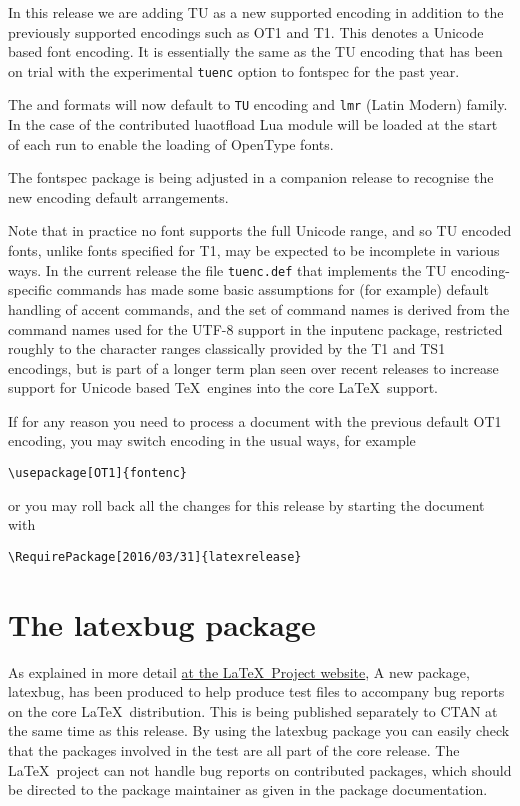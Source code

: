 \documentclass{ltnews}
\begin{document}
In this release we are adding TU as a new supported
encoding in addition to the previously supported encodings such as OT1
and T1. This denotes a Unicode based font encoding. It is essentially
the same as the TU encoding that has been on trial with the
experimental \texttt{tuenc} option to \textsf{fontspec} for the past
year.

The  and  formats will now default
to \texttt{TU} encoding and \texttt{lmr} (Latin Modern) family. In the
case of  the contributed \textsf{luaotfload} Lua
module will be loaded at the start of each run to enable the loading
of OpenType fonts.

The \textsf{fontspec} package is being adjusted in a companion release
to recognise the new encoding default arrangements.

Note that in practice no font supports the full Unicode range, and so
TU encoded fonts, unlike fonts specified for T1, may be expected to be
incomplete in various ways. In the current release the file
\texttt{tuenc.def} that implements the TU encoding-specific commands
has made some basic assumptions for (for example) default handling of
accent commands, and the set of command names is derived from the
command names used for the UTF-8 support in the inputenc package,
restricted roughly to the character ranges classically provided by
the T1 and TS1 encodings, but is part of a longer term plan seen over
recent releases to increase support for Unicode based \TeX\ engines into
the core \LaTeX\ support.



If for any reason you need to process a document with the previous
default OT1 encoding, you may switch encoding in the usual ways, for
example
\begin{verbatim}
\usepackage[OT1]{fontenc}
\end{verbatim}
or you may roll back all the changes for this release by starting the
document with
\begin{verbatim}
\RequirePackage[2016/03/31]{latexrelease}
\end{verbatim}

\section{The \textsf{latexbug} package}

As explained in more detail
\href{https://www.latex-project.org/bugs/}{at the \LaTeX\ Project
  website},
A new package, \textsf{latexbug}, has been produced to help produce
test files to accompany bug reports on the core \LaTeX\ distribution.
This is being published separately to CTAN at the same time as this
release. By using the \textsf{latexbug} package you can easily check
that the packages involved in the test are all part of the core
release. The \LaTeX\ project can not handle bug reports on contributed
packages, which should be directed to the package maintainer as given
in the package documentation.
\end{document}
